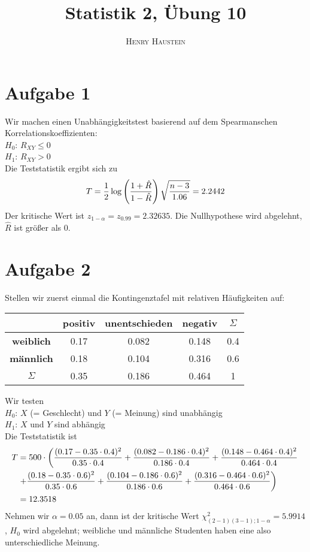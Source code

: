 \documentclass{article}
\title{\textbf{Statistik 2, Übung 10}}
\author{\textsc{Henry Haustein}}
\date{}
\begin{document}
	\maketitle
	
	\section*{Aufgabe 1}
	Wir machen einen Unabhängigkeitstest basierend auf dem Spearmanschen Korrelationskoeffizienten: \\
	$H_0$: $R_{XY}\le0$ \\
	$H_1$: $R_{XY}> 0$ \\
	Die Teststatistik ergibt sich zu
	\begin{align}
		T = \frac{1}{2}\log\left(\frac{1+\hat{R}}{1-\hat{R}}\right)\sqrt{\frac{n-3}{1.06}} = 2.2442 \notag
	\end{align}
	Der kritische Wert ist $z_{1-\alpha}=z_{0.99}=2.32635$. Die Nullhypothese wird abgelehnt, $\hat{R}$ ist größer als 0.
	
	\section*{Aufgabe 2}
	Stellen wir zuerst einmal die Kontingenztafel mit relativen Häufigkeiten auf:
	\begin{center}
		\begin{tabular}{c|ccc|c}
			& \textbf{positiv} & \textbf{unentschieden} & \textbf{negativ} & $\Sigma$ \\
			\hline
			\textbf{weiblich} & 0.17 & 0.082 & 0.148 & 0.4 \\
			\textbf{männlich} & 0.18 & 0.104 & 0.316 & 0.6 \\
			\hline
			$\Sigma$ & 0.35 & 0.186 & 0.464 & 1
		\end{tabular}
	\end{center}
	Wir testen \\
	$H_0$: $X$ (= Geschlecht) und $Y$ (= Meinung) sind unabhängig \\
	$H_1$: $X$ und $Y$ sind abhängig \\
	Die Teststatistik ist
	\begin{align}
		T &= 500\cdot\left(\frac{(0.17 - 0.35\cdot 0.4)^2}{0.35\cdot 0.4} + \frac{(0.082 - 0.186\cdot 0.4)^2}{0.186\cdot 0.4} + \frac{(0.148 - 0.464\cdot 0.4)^2}{0.464\cdot 0.4}\right. \notag \\
		&\left.+ \frac{(0.18 - 0.35\cdot 0.6)^2}{0.35\cdot 0.6} + \frac{(0.104 - 0.186\cdot 0.6)^2}{0.186\cdot 0.6} + \frac{(0.316 - 0.464\cdot 0.6)^2}{0.464\cdot 0.6}\right) \notag \\
		&= 12.3518 \notag
	\end{align}
	Nehmen wir $\alpha=0.05$ an, dann ist der kritische Wert $\chi^2_{(2-1)(3-1);1-\alpha}=5.9914$, $H_0$ wird abgelehnt; weibliche und männliche Studenten haben eine also unterschiedliche Meinung.
	
\end{document}
